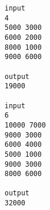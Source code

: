 \begin{verbatim}
input 
4 
5000 3000 
6000 2000 
8000 1000 
9000 6000 
 
output 
19000 

input 
6 
10000 7000 
9000 3000 
6000 4000 
5000 1000 
9000 3000 
8000 6000 
 
output 
32000 


\end{verbatim}